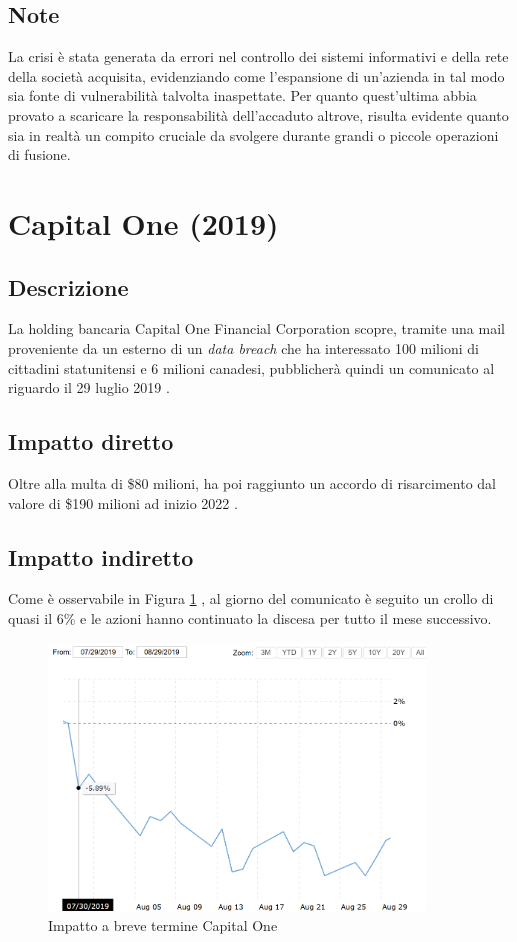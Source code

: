 \documentclass[12pt,a4paper,twoside]{report}
\begin{document}
\subsection{Note}
La crisi \`e stata generata da errori nel controllo dei sistemi informativi e della rete della societ\`a acquisita, evidenziando come l'espansione di un'azienda in tal modo sia fonte di vulnerabilit\`a talvolta inaspettate. Per quanto quest'ultima abbia provato a scaricare la responsabilit\`a dell'accaduto altrove, risulta evidente quanto sia in realt\`a un compito cruciale da svolgere durante grandi o piccole operazioni di fusione.\\ 
\section{Capital One (2019)}
\subsection{Descrizione}
La holding bancaria Capital One Financial Corporation scopre, tramite una mail proveniente da un esterno di un \textit{data breach} che ha interessato 100 milioni di cittadini statunitensi e 6 milioni canadesi, pubblicher\`a quindi un comunicato al riguardo il 29 luglio 2019 \cite{CapitalOne_case_study}.
\subsection{Impatto diretto}
Oltre alla multa di \$80  milioni, ha poi raggiunto un accordo di risarcimento dal valore di \$190 milioni ad inizio 2022 \cite{CapitalOne_settlement}.
\subsection{Impatto indiretto}
Come \`e osservabile in Figura \ref{fig:cpto1} \cite{macrotrends_capitalone}, al giorno del comunicato \`e seguito un crollo di quasi il 6\% e le azioni hanno continuato la discesa per tutto il mese successivo.\\ 
\begin{figure}[H] 
\begin{center} 
\includegraphics[width=10cm]{figures/capitalOne_short.png} 
\caption[Grafico Capital One short]{Impatto a breve termine Capital One}\label{fig:cpto1}
\end{center}
\end{figure}
\end{document}
